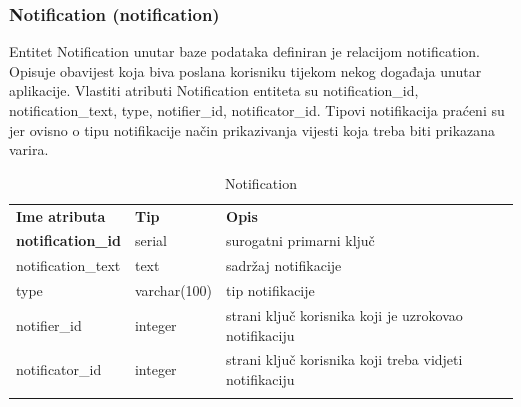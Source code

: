 \documentclass[times, utf8, zavrsni]{fer}
\begin{document}
		\subsubsection{Notification (notification)}
		Entitet Notification unutar baze podataka definiran je relacijom notification. Opisuje obavijest koja biva poslana korisniku tijekom nekog događaja unutar aplikacije. Vlastiti atributi Notification entiteta su notification\_id, notification\_text, type, notifier\_id, notificator\_id. Tipovi notifikacija praćeni su jer ovisno o tipu notifikacije način prikazivanja vijesti koja treba biti prikazana varira.
		\begin{table}[H]
			\caption{Notification}
			\label{tbl:notification}
			\centering
			\begin{tabu} to \textwidth {XXX}
				\tabucline[1.75pt]{-}
				\textbf{Ime atributa} & \textbf{Tip} & \textbf{Opis}\\ 				
				\tabucline[1pt]{-}
				\textbf{notification\_id} & serial & surogatni primarni ključ\\ \hline
				notification\_text & text & sadržaj notifikacije\\ \hline
				type & varchar(100) & tip notifikacije\\ \hline
				notifier\_id & integer & strani ključ korisnika koji je uzrokovao notifikaciju\\ \hline
				notificator\_id & integer & strani ključ korisnika koji treba vidjeti notifikaciju\\ \hline
				\tabucline[1.75pt]{-}
			\end{tabu}
		\end{table}
	
\end{document}
